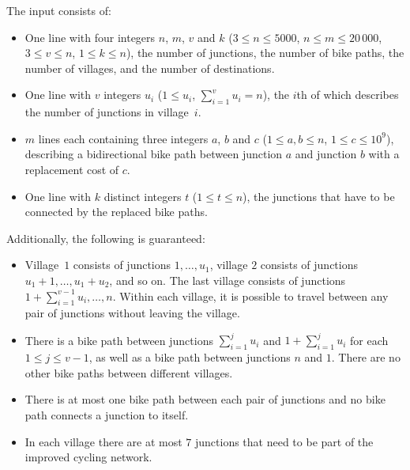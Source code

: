 
    The input consists of:
    \begin{itemize}
    \item One line with four integers $n$, $m$, $v$ and $k$ ($3\leq n\leq 5000$, $n \leq m \leq 20\,000$, $3 \leq v \leq n$, $1 \leq k \leq n$), the number of junctions, the number of bike paths, the number of villages, and the number of destinations.
    \item One line with $v$ integers $u_i$ ($1 \leq u_i$, $\sum_{i=1}^v u_i = n$), the $i$th of which describes the number of junctions in village~$i$.
		\item $m$ lines each containing three integers $a$, $b$ and $c$ ($1 \leq a,b \leq n$, $1 \leq c \leq 10^9$), describing a bidirectional bike path between junction $a$ and junction $b$ with a replacement cost of $c$.
		\item One line with $k$ distinct integers $t$ ($1 \leq t \leq n$), the junctions that have to be connected by the replaced bike paths.
    \end{itemize}
\pagebreak
  Additionally, the following is guaranteed:
  \begin{itemize}
    \item Village~$1$ consists of junctions $1,\dots, u_1$, village $2$ consists of junctions $u_1 + 1, \dots, u_1 + u_2$, and so on.
      The last village consists of junctions $1+ \sum_{i = 1}^{v-1} u_i , \dots, n$.
      Within each village, it is possible to travel between any pair of junctions without leaving the village.
    \item There is a bike path between junctions $\sum_{i=1}^{j} u_i$ and $1 + \sum_{i=1}^{j} u_i$ for each $1 \leq j \leq v-1$, as well as a bike path between junctions $n$ and $1$.
      There are no other bike paths between different villages.
    \item There is at most one bike path between each pair of junctions and no bike path connects a junction to itself.
    \item In each village there are at most $7$ junctions that need to be part of the improved cycling network.
  \end{itemize}
